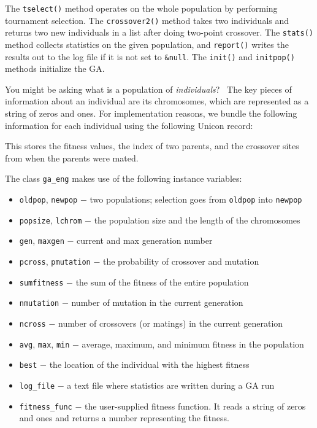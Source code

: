 The \texttt{tselect()} method operates on the whole population by
performing tournament selection. The \texttt{crossover2()} method takes
two individuals and returns two new individuals in a list after doing
two-point crossover. The \texttt{stats()} method collects statistics on
the given population, and \texttt{report()} writes the results out to
the log file if it is not set to \texttt{\&null}. The \texttt{init()}
and \texttt{initpop()} methods initialize the GA.

You might be asking what is a population of \textit{individuals}? \ The
key pieces of information about an individual are its chromosomes,
which are represented as a string of zeros and ones. For implementation
reasons, we bundle the following information for each individual using
the following Unicon record:


This stores the fitness values, the index of two parents, and the
crossover sites from when the parents were mated.

The class \texttt{ga\_eng} makes use of the following
instance variables:

\begin{itemize}
\item \texttt{oldpop}, \texttt{newpop} $-$ two populations; selection
goes from \texttt{oldpop} into \texttt{newpop}
\item \texttt{popsize}, \texttt{lchrom} $-$ the population size and the
length of the chromosomes
\item \texttt{gen}, \texttt{maxgen} $-$ current and max generation
number
\item \texttt{pcross}, \texttt{pmutation} $-$ the probability of
crossover and mutation
\item \texttt{sumfitness} $-$ the sum of the fitness of the entire
population
\item \texttt{nmutation} $-$ number of mutation in the current
generation
\item \texttt{ncross} $-$ number of crossovers (or matings) in the
current generation
\item \texttt{avg}, \texttt{max}, \texttt{min} $-$ average, maximum, and
minimum fitness in the population
\item \texttt{best} $-$ the location of the individual with the highest
fitness
\item \texttt{log\_file} $-$ a text file where statistics are written
during a GA run
\item \texttt{fitness\_func} $-$ the user-supplied fitness function. It
reads a string of zeros and ones and returns a number representing the
fitness.
\end{itemize}


